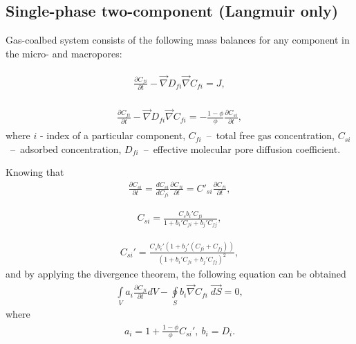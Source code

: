 \documentclass[a4paper,14pt,english]{extreport}
\begin{document}
 \subsection*{Single-phase two-component (Langmuir only)}
Gas-coalbed system consists of the following mass balances for any component in the micro- and macropores:

\begin{eqnarray}
\begin{gathered}
\label{eq:langm_only_free_diffusivity_differential}
\frac{\partial C_{fi}}{\partial t} - \vec{\nabla} D_{fi} \vec{\nabla}C_{fi} = J,
\end{gathered}
\end{eqnarray}

\begin{eqnarray}
\begin{gathered}
\label{eq:langm_only_adsorbed_diffusivity_differential}
\frac{\partial C_{fi}}{\partial t} - \vec{\nabla} D_{fi} \vec{\nabla}C_{fi} = - \frac{1 - \phi}{\phi} \frac{\partial C_{si}}{\partial t},
\end{gathered}
\end{eqnarray}
where $i$ - index of  a particular component, $C_{fi}$~--~total free gas concentration, $C_{si}$~--~adsorbed concentration, $D_{fi}$~--~effective molecular pore diffusion coefficient.

Knowing that
\begin{eqnarray}
\label{eq:langm_only_chain_rule_timeder}
\frac{\partial C_{si}}{\partial t} =  \frac{dC_{si}}{dC_{fi}}\frac{\partial C_{fi}}{\partial t} = C'_{si}\frac{\partial C_{fi}}{\partial t},
\end{eqnarray}

\begin{eqnarray}
\label{eq:langm_only_adsorbed_conc}
C_{si} =  \frac{C_{s} b_{i}' C_{fi}}{1+b_{i}'C_{fi}+b_{j}'C_{fj}},
\end{eqnarray}

\begin{eqnarray}
\label{eq:langm_only_adsorbed_conc_deriv}
C_{si}' =  \frac{C_{s}b_{i}' \left(1+b_{j}'\left(C_{fi}+C_{fj}\right)\right)}{\left(1+b_{i}'C_{fi}+b_{j}'C_{fj}\right)^2},
\end{eqnarray}
and by applying the divergence theorem, the following equation can be obtained
\begin{eqnarray}
\label{eq:langm_only_diffusivity_simplified_integral}
\int \limits_{V} a_{i} \frac{\partial C_{fi}}{\partial t} dV - \oint \limits_{S} b_{i} \vec{\nabla}C_{fi} \; \vec{dS} = 0,
\end{eqnarray}
where
\begin{eqnarray}
\begin{gathered}
\label{eq:langm_only_diffusivity_a_b_coeffs}
a_{i}  =  1+\frac{1 - \phi}{\phi}C_{si}', \: b_{i}  = D_{i}.
\end{gathered}
\end{eqnarray}
\end{document}
